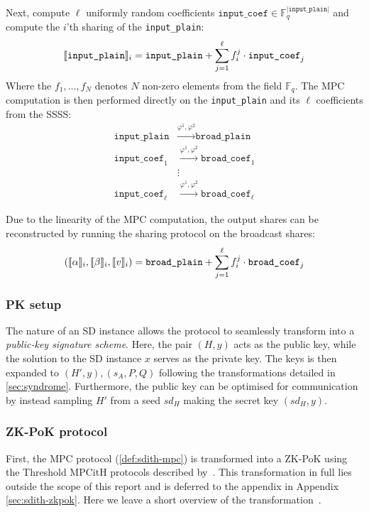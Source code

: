 \documentclass[11pt]{report}
\theoremstyle{definition}
\theoremstyle{plain}
\begin{document}
Next, compute $\ell$ uniformly random coefficients $\texttt{input\_coef} \in \mathbb{F}_q^{|\texttt{input\_plain}|}$ and compute the $i$'th sharing of the \texttt{input\_plain}:
\begin{align}\label{equation:input_sharing}
  \llbracket \texttt{input\_plain} \rrbracket_i = \texttt{input\_plain} + \sum_{j=1}^\ell f_i^j \cdot \texttt{input\_coef}_j
\end{align}
Where the $f_1,\dots,f_N$ denotes $N$ non-zero elements from the field $\mathbb{F}_q$.
The MPC computation is then performed directly on the \texttt{input\_plain} and its $\ell$ coefficients from the SSSS:
\begin{align*}
  \texttt{input\_plain}     & \stackrel{\varphi^1, \varphi^2}{\longrightarrow} \texttt{broad\_plain}     \\
  \texttt{input\_coef}_1    & \stackrel{\varphi^1, \varphi^2}{\longrightarrow} \texttt{broad\_coef}_1    \\
                            & \vdots                                                                     \\
  \texttt{input\_coef}_\ell & \stackrel{\varphi^1, \varphi^2}{\longrightarrow} \texttt{broad\_coef}_\ell
\end{align*}

Due to the linearity of the MPC computation, the output shares can be reconstructed by running the sharing protocol on the broadcast shares:
\begin{align}\label{equation:input_sharing_reverse}
  (\llbracket \alpha \rrbracket_i, \llbracket \beta \rrbracket_i, \llbracket v \rrbracket_i) = \texttt{broad\_plain} + \sum_{j=1}^\ell f_i^j \cdot \texttt{broad\_coef}_j
\end{align}

\subsubsection{PK setup}
The nature of an SD instance allows the protocol to seamlessly transform into a \textit{public-key signature scheme}. Here, the pair $(H, y)$ acts as the public key, while the solution to the SD instance $x$ serves as the private key. The keys is then expanded to $(H', y), (s_A, P, Q)$ following the transformations detailed in \autoref{sec:syndrome}. Furthermore, the public key can be optimised for communication by instead sampling $H'$ from a seed $sd_H$ making the secret key $(sd_H, y)$.

\subsubsection{ZK-PoK protocol}
First, the MPC protocol (\autoref{def:sdith-mpc}) is transformed into a ZK-PoK using the Threshold MPCitH protocols described by~\cite{feneuil2023threshold,feneuil2023threshold2}. This transformation in full lies outside the scope of this report and is deferred to the appendix in Appendix \ref{sec:sdith-zkpok}. Here we leave a short overview of the transformation~\cite{aguilarsyndrome11}.
\end{document}
